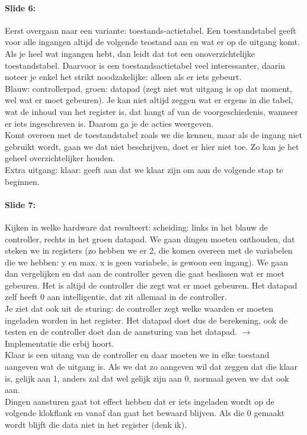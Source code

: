 \documentclass[10pt,a4paper]{book}
\begin{document}
\paragraph{Slide 6:} Eerst overgaan naar een variante: toestands-actietabel. Een toestandstabel geeft voor alle ingangen altijd de volgende teostand aan en wat er op de uitgang komt. Als je heel wat ingangen hebt, dan leidt dat tot een onoverzichtelijke toestandstabel. Daarvoor is een toestandsactietabel veel interessanter, daarin noteer je enkel het strikt noodzakelijke: alleen als er iets gebeurt.\\
Blauw: controllerpad, groen: datapad (zegt niet wat uitgang is op dat moment, wel wat er moet gebeuren). Je kan niet altijd zeggen wat er ergens in die tabel, wat de inhoud van het register is, dat hangt af van de voorgeschiedenis, wanneer er iets ingeschreven is. Daarom ga je de acties weergeven.\\
Komt overeen met de toestandstabel zoals we die kennen, maar als de ingang niet gebruikt wordt, gaan we dat niet beschrijven, doet er hier niet toe. Zo kan je het geheel overzichtelijker houden.\\
Extra uitgang: klaar: geeft aan dat we klaar zijn om aan de volgende stap te beginnen. 

\paragraph{Slide 7:} Kijken in welke hardware dat resulteert: scheiding: links in het blauw de controller, rechts in het groen datapad. We gaan dingen moeten onthouden, dat steken we in registers (zo hebben we er 2, die komen overeen met de variabelen die we hebben: y en max. x is geen variabele, is gewoon een ingang). We gaan dan vergelijken en dat aan de controller geven die gaat beslissen wat er moet gebeuren. Het is altijd de controller die zegt wat er moet gebeuren. Het datapad zelf heeft 0 aan intelligentie, dat zit allemaal in de controller.\\
Je ziet dat ook uit de sturing: de controller zegt welke waarden er moeten ingeladen worden in het register. Het datapad doet dus de berekening, ook de testen en de controller doet dan de aansturing van het datapad. $\rightarrow$ Implementatie die erbij hoort.\\
Klaar is een uitang van de controller en daar moeten we in elke toestand aangeven wat de uitgang is. Als we dat zo aangeven wil dat zeggen dat die klaar is, gelijk aan 1, anders zal dat wel gelijk zijn aan 0, normaal geven we dat ook aan.\\
Dingen aansturen gaat tot effect hebben dat er iets ingeladen wordt op de volgende klokflank en vanaf dan gaat het bewaard blijven. Als die 0 gemaakt wordt blijft die data niet in het register (denk ik).
\end{document}
